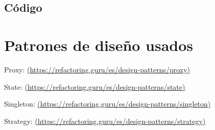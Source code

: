 \documentclass[11pt,a4paper]{article}
\begin{document}
\subsection{Código}



















\section{Patrones de diseño usados}

Proxy: \url{(https://refactoring.guru/es/design-patterns/proxy)}

State: \url{(https://refactoring.guru/es/design-patterns/state)}

Singleton: \url{(https://refactoring.guru/es/design-patterns/singleton)}

Strategy: \url{(https://refactoring.guru/es/design-patterns/strategy)}
\end{document}
